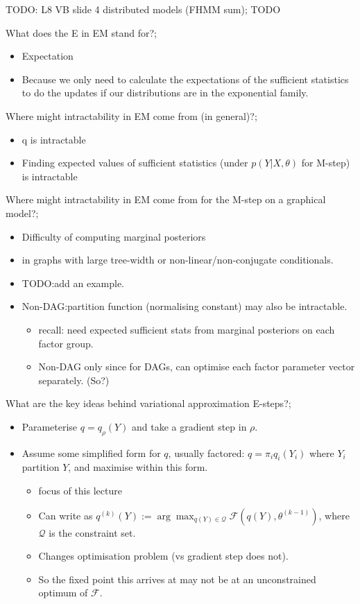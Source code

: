 \documentclass{article}
\begin{document}
TODO: L8 VB slide 4 distributed models (FHMM sum); TODO

What does the E in EM stand for?; \begin{itemize}
	\item Expectation
	\item Because we only need to calculate the expectations of the sufficient statistics to do the updates if our distributions are in the exponential family.
\end{itemize}

Where might intractability in EM come from (in general)?; \begin{itemize}
	\item q is intractable
	\item Finding expected values of sufficient statistics (under $p(Y|X,\theta)$ for M-step) is intractable
\end{itemize}

Where might intractability in EM come from for the M-step on a graphical model?; \begin{itemize}
	\item Difficulty of computing marginal posteriors 
	\item in graphs with large tree-width or non-linear/non-conjugate conditionals.
	\item TODO:add an example.
	\item Non-DAG:partition function (normalising constant) may also be intractable.
	\begin{itemize}
		\item recall: need expected sufficient stats from marginal posteriors on each factor group.
		\item Non-DAG only since for DAGs, can optimise each factor parameter vector separately. (So?)
	\end{itemize}
\end{itemize}

What are the key ideas behind variational approximation E-steps?; \begin{itemize}
	\item Parameterise $q=q_{\rho}(Y)$ and take a gradient step in $\rho$.
	\item Assume some simplified form for $q$, usually factored: $q=\pi_i q_i(Y_i)$ where $Y_i$ partition $Y$, and maximise within this form. 
	\begin{itemize}
		\item focus of this lecture
		\item Can write as $q^{(k)}(Y):=\arg\max_{q(Y)\in\mathcal{Q}}\mathcal{F}(q(Y),\theta^{(k-1)})$, where $\mathcal{Q}$ is the constraint set.
		\item Changes optimisation problem (vs gradient step does not).
		\item So the fixed point this arrives at may not be at an unconstrained optimum of $\mathcal{F}$.
	\end{itemize}
\end{itemize}
\end{document}
